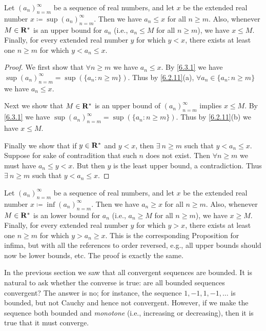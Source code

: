 \setcounter{theorem}{5}
\begin{proposition}\label{6.3.6}
  Let \((a_n)_{n = m}^\infty\) be a sequence of real numbers, and let \(x\) be the extended real number \(x \coloneqq \sup(a_n)_{n = m}^\infty\).
  Then we have \(a_n \leq x\) for all \(n \geq m\).
  Also, whenever \(M \in \mathbf{R}^*\) is an upper bound for \(a_n\) (i.e., \(a_n \leq M\) for all \(n \geq m\)), we have \(x \leq M\).
  Finally, for every extended real number \(y\) for which \(y < x\), there exists at least one \(n \geq m\) for which \(y < a_n \leq x\).
\end{proposition}

\begin{proof}
  We first show that \(\forall n \geq m\) we have \(a_n \leq x\).
  By \cref{6.3.1} we have \(\sup(a_n)_{n = m}^\infty = \sup(\{a_n : n \geq m\})\).
  Thus by \cref{6.2.11}(a), \(\forall a_n \in \{a_n : n \geq m\}\) we have \(a_n \leq x\).

  Next we show that \(M \in \mathbf{R}^*\) is an upper bound of \((a_n)_{n = m}^\infty\) implies \(x \leq M\).
  By \cref{6.3.1} we have \(\sup(a_n)_{n = m}^\infty = \sup(\{a_n : n \geq m\})\).
  Thus by \cref{6.2.11}(b) we have \(x \leq M\).

  Finally we show that if \(y \in \mathbf{R}^*\) and \(y < x\), then \(\exists\ n \geq m\) such that \(y < a_n \leq x\).
  Suppose for sake of contradition that such \(n\) does not exist.
  Then \(\forall n \geq m\) we must have \(a_n \leq y < x\).
  But then \(y\) is the least upper bound, a contradiction.
  Thus \(\exists\ n \geq m\) such that \(y < a_n \leq x\).
\end{proof}

\begin{remark}\label{6.3.7}
  Let \((a_n)_{n = m}^\infty\) be a sequence of real numbers, and let \(x\) be the extended real number \(x \coloneqq \inf(a_n)_{n = m}^\infty\).
  Then we have \(a_n \geq x\) for all \(n \geq m\).
  Also, whenever \(M \in \mathbf{R}^*\) is an lower bound for \(a_n\) (i.e., \(a_n \geq M\) for all \(n \geq m\)), we have \(x \geq M\).
  Finally, for every extended real number \(y\) for which \(y > x\), there exists at least one \(n \geq m\) for which \(y > a_n \geq x\).
  This is the corresponding Proposition for infima, but with all the references to order reversed, e.g., all upper bounds should now be lower bounds, etc.
  The proof is exactly the same.
\end{remark}

\begin{note}
  In the previous section we saw that all convergent sequences are bounded.
  It is natural to ask whether the converse is true:
  are all bounded sequences convergent?
  The answer is no;
  for instance, the sequence \(1, -1, 1, -1, \dots\) is bounded, but not Cauchy and hence not convergent.
  However, if we make the sequence both bounded and \emph{monotone} (i.e., increasing or decreasing), then it is true that it must converge.
\end{note}

